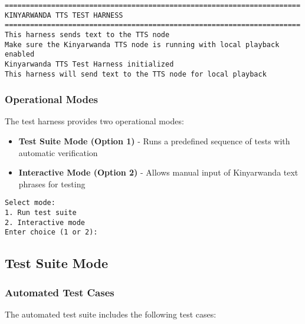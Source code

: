 \documentclass{CSSRforAfrica}
\begin{document}
\begin{lstlisting}[style=commandstyle]
======================================================================
KINYARWANDA TTS TEST HARNESS
======================================================================
This harness sends text to the TTS node
Make sure the Kinyarwanda TTS node is running with local playback enabled
Kinyarwanda TTS Test Harness initialized
This harness will send text to the TTS node for local playback
\end{lstlisting}

\subsubsection{Operational Modes}
The test harness provides two operational modes:

\begin{itemize}
    \item \textbf{Test Suite Mode (Option 1)} - Runs a predefined sequence of tests with automatic verification
    \item \textbf{Interactive Mode (Option 2)} - Allows manual input of Kinyarwanda text phrases for testing
\end{itemize}

\begin{lstlisting}[style=commandstyle]
Select mode:
1. Run test suite
2. Interactive mode
Enter choice (1 or 2): 
\end{lstlisting}

\subsection{Test Suite Mode}
\subsubsection{Automated Test Cases}
The automated test suite includes the following test cases:
\end{document}
